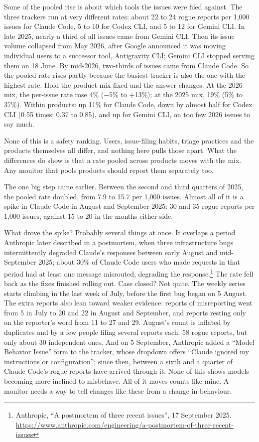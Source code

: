 Some of the pooled rise is about which tools the issues were filed against. The three trackers run at very different rates: about 22 to 24 rogue reports per 1,000 issues for Claude Code, 5 to 10 for Codex CLI, and 5 to 12 for Gemini CLI. In late 2025, nearly a third of all issues came from Gemini CLI. Then its issue volume collapsed from May 2026, after Google announced it was moving individual users to a successor tool, Antigravity CLI; Gemini CLI stopped serving them on 18 June. By mid-2026, two-thirds of issues came from Claude Code. So the pooled rate rises partly because the busiest tracker is also the one with the highest rate. Hold the product mix fixed and the answer changes. At the 2026 mix, the per-issue rate rose 4\% (−5\% to +13\%); at the 2025 mix, 19\% (5\% to 37\%). Within products: up 11\% for Claude Code, down by almost half for Codex CLI (0.55 times; 0.37 to 0.85), and up for Gemini CLI, on too few 2026 issues to say much.

None of this is a safety ranking. Users, issue-filing habits, triage practices and the products themselves all differ, and nothing here pulls those apart. What the differences do show is that a rate pooled across products moves with the mix. Any monitor that pools products should report them separately too.

The one big step came earlier. Between the second and third quarters of 2025, the pooled rate doubled, from 7.9 to 15.7 per 1,000 issues. Almost all of it is a spike in Claude Code in August and September 2025: 30 and 35 rogue reports per 1,000 issues, against 15 to 20 in the months either side.

What drove the spike? Probably several things at once. It overlaps a period Anthropic later described in a postmortem, when three infrastructure bugs intermittently degraded Claude’s responses between early August and mid-September 2025; about 30\% of Claude Code users who made requests in that period had at least one message misrouted, degrading the response.\footnote{Anthropic, “A postmortem of three recent issues”, 17 September 2025. \url{https://www.anthropic.com/engineering/a-postmortem-of-three-recent-issues}} The rate fell back as the fixes finished rolling out. Case closed? Not quite. The weekly series starts climbing in the last week of July, before the first bug began on 5 August. The extra reports also lean toward weaker evidence: reports of misreporting went from 5 in July to 20 and 22 in August and September, and reports resting only on the reporter’s word from 11 to 27 and 29. August’s count is inflated by duplicates and by a few people filing several reports each: 58 rogue reports, but only about 30 independent ones. And on 5 September, Anthropic added a “Model Behavior Issue” form to the tracker, whose dropdown offers “Claude ignored my instructions or configuration”; since then, between a sixth and a quarter of Claude Code’s rogue reports have arrived through it. None of this shows models becoming more inclined to misbehave. All of it moves counts like mine. A monitor needs a way to tell changes like these from a change in behaviour.

